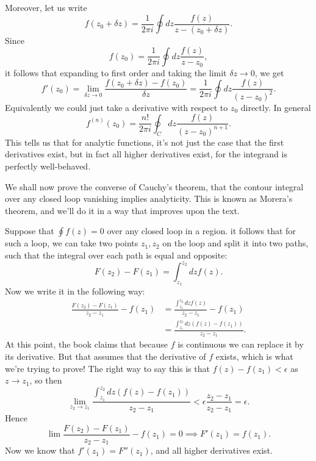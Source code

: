 Moreover, let us write
\begin{equation}
    f(z_0+\delta z) = \frac{1}{2\pi i} \oint dz \frac{f(z)}{z-(z_0+\delta z)}.
\end{equation}
Since
\begin{equation}
    f(z_0) = \frac{1}{2\pi i} \oint dz \frac{f(z)}{z-z_0},
\end{equation}
it follows that expanding to first order and taking the limit $\delta z \to 0$, we get
\begin{equation}
    f'(z_0) = \lim_{\delta z \to 0} \frac{f(z_0+\delta z) - f(z_0)}{\delta z} = \frac{1}{2\pi i} \oint dz \frac{f(z)}{(z-z_0)^2}.
\end{equation}
Equivalently we could just take a derivative with respect to $z_0$ directly. In general
\begin{equation}
    f^{(n)}(z_0) = \frac{n!}{2\pi i} \oint_C dz \frac{f(z)}{(z-z_0)^{n+1}}.
\end{equation}
This tells us that for analytic functions, it's not just the case that the first derivatives exist, but in fact all higher derivatives exist, for the integrand is perfectly well-behaved.

We shall now prove the converse of Cauchy's theorem, that the contour integral over any closed loop vanishing implies analyticity. This is known as Morera's theorem, and we'll do it in a way that improves upon the text.

Suppose that $\oint f(z)=0$ over any closed loop in a region. it follows that for such a loop, we can take two points $z_1,z_2$ on the loop and split it into two paths, such that the integral over each path is equal and opposite:
\begin{equation}
    F(z_2)-F(z_1) = \int_{z_1}^{z_2} dz f(z).
\end{equation}
Now we write it in the following way:
\begin{align*}
    \frac{F(z_2)-F(z_1)}{z_2-z_1} -f(z_1) &= \frac{\int_{z_1}^{z_2} dz f(z) }{z_2-z_1} -f(z_1)\\
        &=\frac{\int_{z_1}^{z_2} dz (f(z)-f(z_1)) }{z_2-z_1}.
\end{align*}
At this point, the book claims that because $f$ is continuous we can replace it by its derivative. But that assumes that the derivative of $f$ exists, which is what we're trying to prove! The right way to say this is that $f(z) - f(z_1) <\epsilon$ as $z\to z_1$, so then
\begin{equation}
    \lim_{z_2\to z_1} \frac{\int_{z_1}^{z_2} dz (f(z)-f(z_1)) }{z_2-z_1} < \epsilon \frac{z_2-z_1}{z_2-z_1} = \epsilon.
\end{equation}
Hence
\begin{equation}
    \lim \frac{F(z_2)-F(z_1)}{z_2-z_1} -f(z_1) =0 \implies F'(z_1) = f(z_1).
\end{equation}
Now we know that $f'(z_1) = F''(z_1)$, and all higher derivatives exist.%

